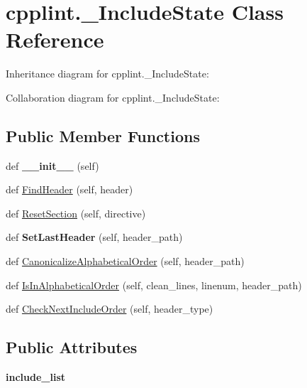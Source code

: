 \hypertarget{classcpplint_1_1__IncludeState}{}\section{cpplint.\+\_\+\+Include\+State Class Reference}
\label{classcpplint_1_1__IncludeState}


Inheritance diagram for cpplint.\+\_\+\+Include\+State\+:


Collaboration diagram for cpplint.\+\_\+\+Include\+State\+:
\subsection*{Public Member Functions}
\begin{DoxyCompactItemize}
\item 
\mbox{\label{classcpplint_1_1__IncludeState_a4d3ae4ee2a38efc25cce07e3e8484ba4}} 
def {\bfseries \+\_\+\+\_\+init\+\_\+\+\_\+} (self)
\item 
def \hyperlink{classcpplint_1_1__IncludeState_a9bddbf581fc7a4c3c0258eaa42b94c3a}{Find\+Header} (self, header)
\item 
def \hyperlink{classcpplint_1_1__IncludeState_a31551f83fcc626e7babb1581a486b6fa}{Reset\+Section} (self, directive)
\item 
\mbox{\label{classcpplint_1_1__IncludeState_a9bc1ada2060a49628c1fffa973b57df1}} 
def {\bfseries Set\+Last\+Header} (self, header\+\_\+path)
\item 
def \hyperlink{classcpplint_1_1__IncludeState_ae69c652befa2d160194c0a02ff0c7d48}{Canonicalize\+Alphabetical\+Order} (self, header\+\_\+path)
\item 
def \hyperlink{classcpplint_1_1__IncludeState_abfda27324121ab0bf9d29866d975274b}{Is\+In\+Alphabetical\+Order} (self, clean\+\_\+lines, linenum, header\+\_\+path)
\item 
def \hyperlink{classcpplint_1_1__IncludeState_a80f82f17565e8412e7e5bbe52b464f18}{Check\+Next\+Include\+Order} (self, header\+\_\+type)
\end{DoxyCompactItemize}
\subsection*{Public Attributes}
\begin{DoxyCompactItemize}
\item 
\mbox{\label{classcpplint_1_1__IncludeState_a82d8b92a431437ee181e950517c71cbb}} 
{\bfseries include\+\_\+list}
\end{DoxyCompactItemize}



